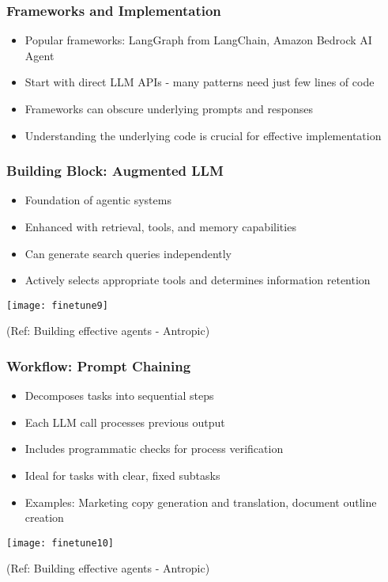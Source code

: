 \begin{frame}[fragile]\frametitle{Frameworks and Implementation}
    \begin{itemize}
        \item Popular frameworks: LangGraph from LangChain, Amazon Bedrock AI Agent
        \item Start with direct LLM APIs - many patterns need just few lines of code
        \item Frameworks can obscure underlying prompts and responses
        \item Understanding the underlying code is crucial for effective implementation
    \end{itemize}
\end{frame}

\begin{frame}[fragile]\frametitle{Building Block: Augmented LLM}
    \begin{itemize}
        \item Foundation of agentic systems
        \item Enhanced with retrieval, tools, and memory capabilities
        \item Can generate search queries independently
        \item Actively selects appropriate tools and determines information retention
    \end{itemize}
	
	\begin{center}
	\texttt{[image: finetune9]}
	\end{center}

	{\tiny (Ref: Building effective agents - Antropic)}
	
\end{frame}

\begin{frame}[fragile]\frametitle{Workflow: Prompt Chaining}
    \begin{itemize}
        \item Decomposes tasks into sequential steps
        \item Each LLM call processes previous output
        \item Includes programmatic checks for process verification
        \item Ideal for tasks with clear, fixed subtasks
        \item Examples: Marketing copy generation and translation, document outline creation
    \end{itemize}
	
	\begin{center}
	\texttt{[image: finetune10]}
	\end{center}

	{\tiny (Ref: Building effective agents - Antropic)}	
\end{frame}

